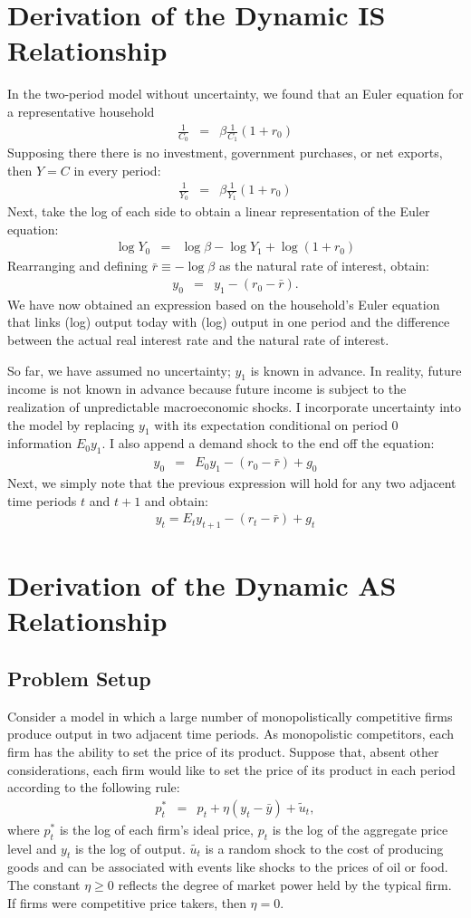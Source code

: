 \documentclass[12pt,fleqn]{article}
\newcommand{\EE}{\begin{eqnarray}}
\newcommand{\FF}{\end{eqnarray}}
\begin{document}
\begin{appendix}
%

\section{Derivation of the Dynamic IS Relationship}

In the two-period model without uncertainty, we found that an Euler equation for a representative household 
	\EE
	\frac{1}{C_0} & = & \beta \frac{1}{C_1} (1+r_{0})
	\FF
Supposing there there is no investment, government purchases, or net exports, then $Y = C$ in every period:
	\EE
	\frac{1}{Y_0} & = & \beta \frac{1}{Y_1} (1+r_{0})
	\FF
Next, take the log of each side to obtain a linear representation of the Euler equation:
	\EE
	\log Y_0 & = & \log \beta - \log Y_1 + \log \left(1+r_{0}\right)
	\FF
Rearranging and defining $\bar{r} \equiv -\log \beta$ as the natural rate of interest, obtain:
	\EE
	y_0 & = & y_1 - (r_{0}-\bar{r}).
	\FF
We have now obtained an expression based on the household's Euler equation that links (log) output today with (log) output in one period and the difference between the actual real interest rate and the natural rate of interest.

So far, we have assumed no uncertainty; $y_1$ is known in advance. In reality, future income is not known in advance because future income is subject to the realization of unpredictable macroeconomic shocks. I incorporate uncertainty into the model by replacing $y_1$ with its expectation conditional on period 0 information $E_0y_1$. I also append a demand shock to the end off the equation:
	\EE
	y_0 & = & E_0y_1 -(r_{0}-\bar{r}) + g_0
	\FF
Next, we simply note that the previous expression will hold for any two adjacent time periods $t$ and $t+1$ and obtain:
	\EE
	\boxed{y_t = E_ty_{t+1} -(r_{t} -\bar{r}) + g_t}
	\FF
	
\section{Derivation of the Dynamic AS Relationship}
	
\subsection{Problem Setup}

Consider a model in which a large number of monopolistically competitive firms produce output in two adjacent time periods. As monopolistic competitors, each firm has the ability to set the price of its product. Suppose that, absent other considerations, each firm would like to set the price of its product in each period according to the following rule:
	\EE
	p^*_t & = & p_t + \eta( y_t-\bar{y}) + \tilde{u}_t,
	\FF
where $p^*_t$ is the log of each firm's ideal price, $p_t$ is the log of the aggregate price level and $y_t$ is the log of output. $\tilde{u_t}$ is a random shock to the cost of producing goods and can be associated with events like shocks to the prices of oil or food. The constant $\eta\geqslant 0$ reflects the degree of market power held by the typical firm. If firms were competitive price takers, then $\eta = 0$.


\end{appendix}
\end{document}
